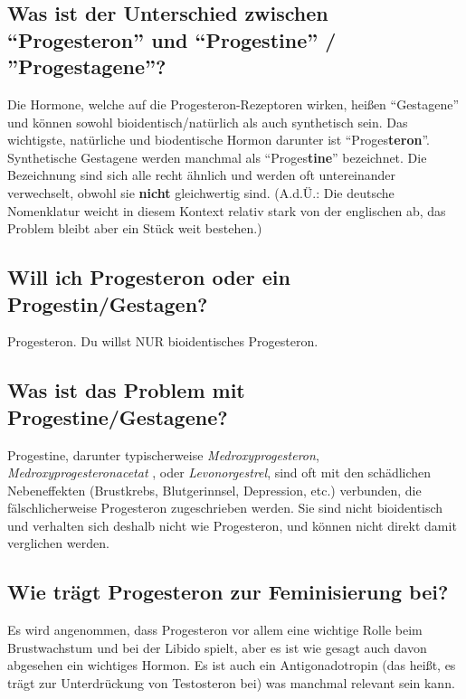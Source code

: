 \documentclass{article}
\begin{document}
{{\subsection{Was ist der Unterschied zwischen “Progesteron” und “Progestine” / ”Progestagene”?}

Die Hormone, welche auf die Progesteron-Rezeptoren wirken, heißen “Gestagene” und können sowohl bioidentisch/natürlich als auch synthetisch sein. Das wichtigste, natürliche und biodentische Hormon darunter ist “Proges\textbf{teron}”. Synthetische Gestagene werden manchmal als “Proges\textbf{tine}” bezeichnet. Die Bezeichnung sind sich alle recht ähnlich und werden oft untereinander verwechselt, obwohl sie \textbf{nicht }gleichwertig sind. (A.d.Ü.: Die deutsche Nomenklatur weicht in diesem Kontext relativ stark von der englischen ab, das Problem bleibt aber ein Stück weit bestehen.)

\subsection{Will ich Progesteron oder ein Progestin/Gestagen?}

Progesteron. Du willst NUR bioidentisches Progesteron.

\subsection{Was ist das Problem mit Progestine/Gestagene?}

Progestine, darunter typischerweise \textit{Medroxyprogesteron}, \textit{Medroxyprogesteronacetat }, oder \textit{Levonorgestrel}, sind oft mit den schädlichen Nebeneffekten (Brustkrebs, Blutgerinnsel, Depression, etc.) verbunden, die fälschlicherweise Progesteron zugeschrieben werden. Sie sind nicht bioidentisch und verhalten sich deshalb nicht wie Progesteron, und können nicht direkt damit verglichen werden.

\subsection{Wie trägt Progesteron zur Feminisierung bei?}

Es wird angenommen, dass Progesteron vor allem eine wichtige Rolle beim Brustwachstum und bei der Libido spielt, aber es ist wie gesagt auch davon abgesehen ein wichtiges Hormon. Es ist auch ein Antigonadotropin (das heißt, es trägt zur Unterdrückung von Testosteron bei) was manchmal relevant sein kann.

}}
\end{document}
